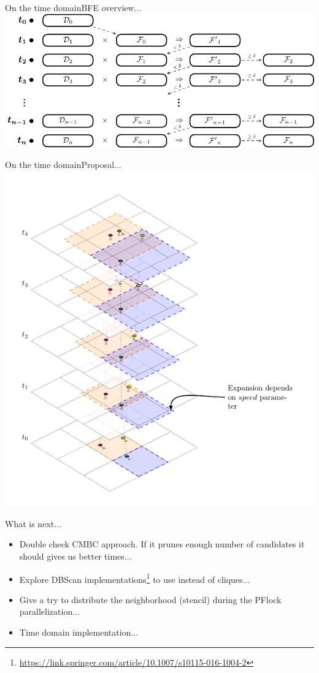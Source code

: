 \documentclass{beamer}
\begin{document}
\begin{frame}{On the time domain}{BFE overview...}
    \centering
    \includegraphics[height=0.55\textheight]{figures/FF_stages}
\end{frame}

\begin{frame}{On the time domain}{Proposal...}
    \centering
    \includegraphics[height=0.85\textheight]{figures/TemporalPartitioning}
\end{frame}

\begin{frame}{What is next...}
    \begin{itemize}
     \item Double check CMBC approach.  If it prunes enough number of candidates it should gives us better times...
     \item Explore DBScan implementations\footnote{\url{https://link.springer.com/article/10.1007/s10115-016-1004-2}} to use instead of cliques...
     \item Give a try to distribute the neighborhood (stencil) during the PFlock parallelization...
     \item Time domain implementation...
    \end{itemize}

\end{frame}
\end{document}
